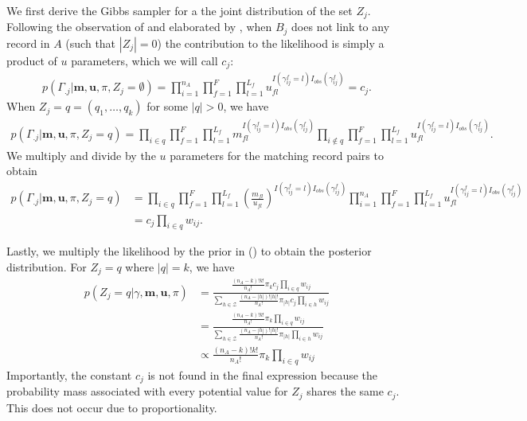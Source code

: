 \documentclass[12pt,letterpaper]{article}
\newcommand{\1}[1]{\mathbb{I}\!\left[#1\right]} %
\begin{document}
We first derive the Gibbs sampler for a the joint distribution of the set $Z_j$. Following the observation of \cite{wortman2019} and elaborated by \cite{kundinger_2023}, when $B_j$ does not link to any record in $A$ (such that $|Z_j| = 0$) the contribution to the likelihood is simply a product of $u$ parameters, which we will call $c_j$:
\begin{align}
	p(\Gamma_{.j}| \bm{m}, \bm{u}, \pi, Z_j = \emptyset) = \prod_{i=1}^{n_A}\prod_{f=1}^{F}\prod_{l=1}^{L_f} u_{fl}^{I(\gamma_{ij}^f = l)I_{obs}(\gamma_{ij}^f)} = c_j.
\end{align}
When $Z_j = q =  (q_1, \ldots, q_k)$ for some $|q| > 0$, we have
\begin{align}
	p(\Gamma_{.j}| \bm{m}, \bm{u}, \pi,  Z_j = q) =\prod_{i \in q}\prod_{f=1}^{F}\prod_{l=1}^{L_f} m_{fl}^{I(\gamma_{ij}^f = l)I_{obs}(\gamma_{ij}^f)}  \prod_{i \notin q}\prod_{f=1}^{F}\prod_{l=1}^{L_f} u_{fl}^{I(\gamma_{ij}^f = l)I_{obs}(\gamma_{ij}^f)}.
\end{align}
We multiply and divide by the $u$ parameters for the matching record pairs to obtain
\begin{align}
	p(\Gamma_{.j}| \bm{m}, \bm{u}, \pi, Z_j = q) &= \prod_{i \in q}\prod_{f=1}^{F}\prod_{l=1}^{L_f} \left(\frac{m_{fl}}{u_{fl}}\right)^{I(\gamma_{ij}^f = l)I_{obs}(\gamma_{ij}^f)}  \prod_{i = 1}^{n_A}\prod_{f=1}^{F}\prod_{l=1}^{L_f} u_{fl}^{I(\gamma_{ij}^f = l)I_{obs}(\gamma_{ij}^f)} \\
	&= c_j \prod_{i \in q} w_{ij} .
\end{align}

Lastly, we multiply the likelihood by the prior in (\label{eqn:z}) to obtain the posterior distribution. For $Z_j = q$ where $|q| = k$, we have
\begin{align}\label{eqn:joint_posterior}
	p\left(Z_j  = q|\gamma, \bm{m}, \bm{u}, \pi \right) &= \frac{\frac{(n_A - k)! k!}{n_A!} \pi_{k} c_j \prod_{i \in q} w_{ij}}{\sum_{h \in \mathcal{Z}} \frac{(n_A - |h|)! |h|!}{n_A!} \pi_{|h|} c_j \prod_{i \in h} w_{ij}} \\
	&= \frac{\frac{(n_A - k)! k!}{n_A!} \pi_{k} \prod_{i \in q} w_{ij}}{\sum_{h \in \mathcal{Z}} \frac{(n_A - |h|)! |h|!}{n_A!} \pi_{|h|} \prod_{i \in h} w_{ij}} \\
	&\propto \frac{(n_A - k)! k!}{n_A!} \pi_{k} \prod_{i \in q} w_{ij}
\end{align}
Importantly, the constant $c_j$ is not found in the final expression because the probability mass associated with every potential value for $Z_j$ shares the same $c_j$. This does not occur due to proportionality. 
\end{document}
